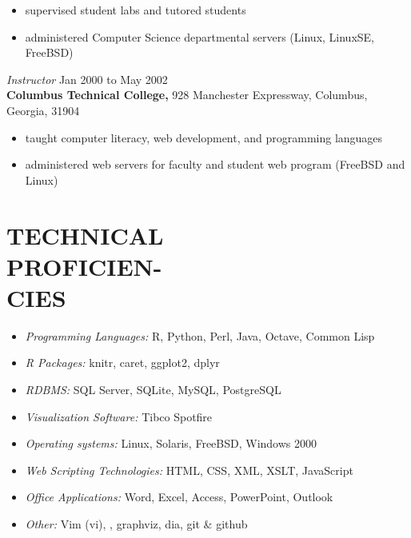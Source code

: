 \documentclass[margin, 11pt]{res} %
\begin{document}
\begin{resume}
\begin{itemize} \itemsep -2pt %
\item supervised student labs and tutored students
\item administered Computer Science departmental servers (Linux, LinuxSE, FreeBSD)
\end{itemize}

{\it Instructor} \hfill Jan 2000 to May 2002 \\
\textbf{Columbus Technical College,} 928 Manchester Expressway, Columbus, Georgia, 31904

\begin{itemize} \itemsep -2pt %
\item taught computer literacy, web development, and programming languages
\item administered web servers for faculty and student web program (FreeBSD and Linux)
\end{itemize}


\section{TECHNICAL\\ PROFICIEN-\\ CIES}

\begin{itemize} \itemsep -2pt %

\item {\it Programming Languages:} \textsf{R}, Python, Perl, Java, Octave, Common Lisp
\item {\it \textsf{R} Packages:} knitr, caret, ggplot2, dplyr
\item {\it RDBMS:} SQL Server, SQLite, MySQL, PostgreSQL
\item {\it Visualization Software:} Tibco Spotfire
\item {\it Operating systems:} Linux, Solaris, FreeBSD, Windows 2000
\item {\it Web Scripting Technologies:} HTML, CSS, XML, XSLT, JavaScript
\item {\it Office Applications:} Word, Excel, Access, PowerPoint, Outlook
\item {\it Other:} Vim (vi), \LaTeXe, graphviz, dia, git \& github
\end{itemize}


\end{resume}
\end{document}
